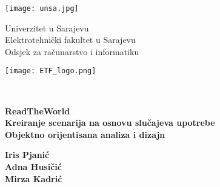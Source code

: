 \documentclass[12pt, a4paper]{report}
\begin{document}
	\begin{titlepage}
		\newcommand{\HRule}{\rule{\linewidth}{1mm}} 
		\noindent
		{\large
			\begin{minipage}{0.2\textwidth}
				\begin{center} 
					\texttt{[image: unsa.jpg]}
				\end{center}
			\end{minipage}
			\begin{minipage}{0.58\textwidth}
				\begin{center} \large
					Univerzitet u Sarajevu\\
					Elektrotehnički fakultet u Sarajevu\\
					Odsjek za računarstvo i informatiku\\
				\end{center}
			\end{minipage}
			\begin{minipage}{0.2\textwidth}
				\begin{center} 
					\texttt{[image: ETF\_logo.png]}
				\end{center}
			\end{minipage}
			\\[6 cm] 
			
			
			\begin{center}
				\LARGE 
				\bfseries 
				ReadTheWorld \\
				\large 
				Kreiranje scenarija na osnovu slučajeva upotrebe   \\[0.5cm]
				
				Objektno orijentisana analiza i dizajn
				\\[6.0 cm] 
			\end{center}	 		
			

			\begin{minipage}{0.9\textwidth}
				\begin{flushright}
					\textbf{Iris Pjanić}  \\
					\textbf{Adna Husičić}  \\			
					\textbf{Mirza Kadrić}  \\
				\end{flushright}
			\end{minipage}\\[1 cm]
		}
	\end{titlepage}
	\renewcommand{\chaptermark}[1]{\markboth{#1}{}}
\end{document}
